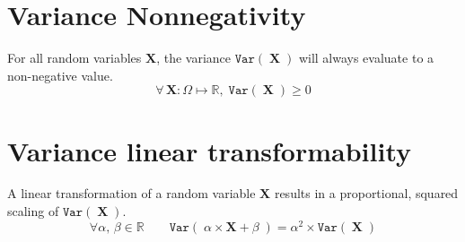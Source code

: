 \documentclass{article}
\newcommand{\Parens}[1]{\ensuremath{\left(\;#1\;\right)}\xspace}
\newcommand{\RandVar}[1]{\ensuremath{\mathbf{#1}}\xspace}
\newcommand{\Reals}{\ensuremath{\mathbb{R}}\xspace}
\newcommand{\Variance}[1]{\ensuremath{\mathtt{Var}\Parens{#1}}\xspace}
\begin{document}
\section*{Variance Nonnegativity}
For all random variables $\RandVar{X}$, the variance \Variance{\RandVar{X}} will always evaluate to a non-negative value.
\[
\forall\,\RandVar{X}: \Omega \mapsto \Reals,\; \Variance{\RandVar{X}} \ge 0
\]


\section*{Variance linear transformability}
A linear transformation of a random variable \RandVar{X} results in a proportional, squared scaling of \Variance{\RandVar{X}}.
\[
\forall \alpha,\,\beta \in \Reals\qquad\Variance{\alpha \times \RandVar{X} + \beta} = \alpha^2 \times \Variance{\RandVar{X}}
\]
\end{document}

